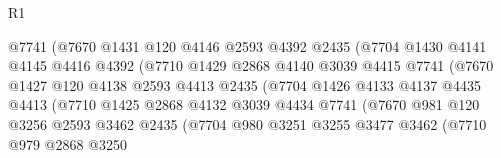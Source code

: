 \begin{lexlean}{R1}
\begin{coremodule}
                              @7741
                              (@7670
                                @1431
                                @120
                                @4146
                                @2593
                                @4392
                                @2435
                                (@7704
                                  @1430
                                  @4141
                                  @4145
                                  @4416
                                  @4392
                                  (@7710
                                    @1429
                                    @2868
                                    @4140
                                    @3039
                                    @4415
                                    @7741
                                    (@7670
                                      @1427
                                      @120
                                      @4138
                                      @2593
                                      @4413
                                      @2435
                                      (@7704
                                        @1426
                                        @4133
                                        @4137
                                        @4435
                                        @4413
                                        (@7710
                                          @1425
                                          @2868
                                          @4132
                                          @3039
                                          @4434
                                          @7741
                                          (@7670
                                            @981
                                            @120
                                            @3256
                                            @2593
                                            @3462
                                            @2435
                                            (@7704
                                              @980
                                              @3251
                                              @3255
                                              @3477
                                              @3462
                                              (@7710
                                                @979
                                                @2868
                                                @3250

\end{coremodule}
\end{lexlean}
